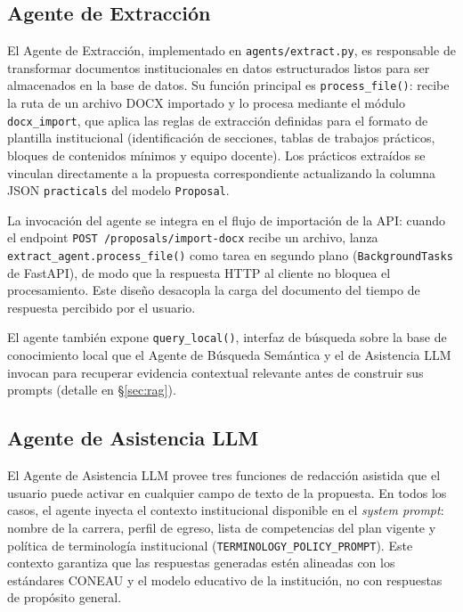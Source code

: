 \subsection{Agente de Extracción}
\label{subsec:agente_extraccion}

El Agente de Extracción, implementado en \texttt{agents/extract.py}, es
responsable de transformar documentos institucionales en datos estructurados
listos para ser almacenados en la base de datos.
Su función principal es \texttt{process\_file()}: recibe la ruta de un archivo
DOCX importado y lo procesa mediante el módulo \texttt{docx\_import}, que
aplica las reglas de extracción definidas para el formato de plantilla
institucional (identificación de secciones, tablas de trabajos prácticos,
bloques de contenidos mínimos y equipo docente).
Los prácticos extraídos se vinculan directamente a la propuesta
correspondiente actualizando la columna JSON \texttt{practicals} del modelo
\texttt{Proposal}.

La invocación del agente se integra en el flujo de importación de la API:
cuando el endpoint \texttt{POST /proposals/import-docx} recibe un archivo,
lanza \texttt{extract\_agent.process\_file()} como tarea en segundo plano
(\texttt{BackgroundTasks} de FastAPI), de modo que la respuesta HTTP al
cliente no bloquea el procesamiento.
Este diseño desacopla la carga del documento del tiempo de respuesta
percibido por el usuario.

El agente también expone \texttt{query\_local()}, interfaz de búsqueda sobre
la base de conocimiento local que el Agente de Búsqueda Semántica y el de
Asistencia LLM invocan para recuperar evidencia contextual relevante antes de
construir sus prompts (detalle en §\ref{sec:rag}).

\subsection{Agente de Asistencia LLM}
\label{subsec:agente_llm}

El Agente de Asistencia LLM provee tres funciones de redacción asistida que
el usuario puede activar en cualquier campo de texto de la propuesta.
En todos los casos, el agente inyecta el contexto institucional disponible
en el \emph{system prompt}: nombre de la carrera, perfil de egreso, lista
de competencias del plan vigente y política de terminología institucional
(\texttt{TERMINOLOGY\_POLICY\_PROMPT}).
Este contexto garantiza que las respuestas generadas estén alineadas con los
estándares CONEAU y el modelo educativo de la institución, no con respuestas
de propósito general.

